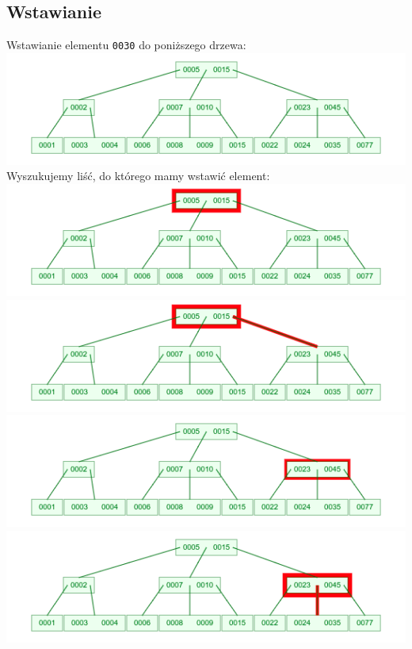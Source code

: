 \documentclass[12pt]{article}
\begin{document}
	\subsection{Wstawianie}
	Wstawianie elementu \texttt{0030} do poniższego drzewa: \\
	\includegraphics[width=\linewidth]{graphics/b-trees/insert/begin.png} \\

	\noindent Wyszukujemy liść, do którego mamy wstawić element: \\
	\includegraphics[width=\linewidth]{graphics/b-trees/insert/find-01.png} \\
	\includegraphics[width=\linewidth]{graphics/b-trees/insert/find-02.png} \\
	\includegraphics[width=\linewidth]{graphics/b-trees/insert/find-03.png} \\
	\includegraphics[width=\linewidth]{graphics/b-trees/insert/find-04.png} \\
\end{document}
